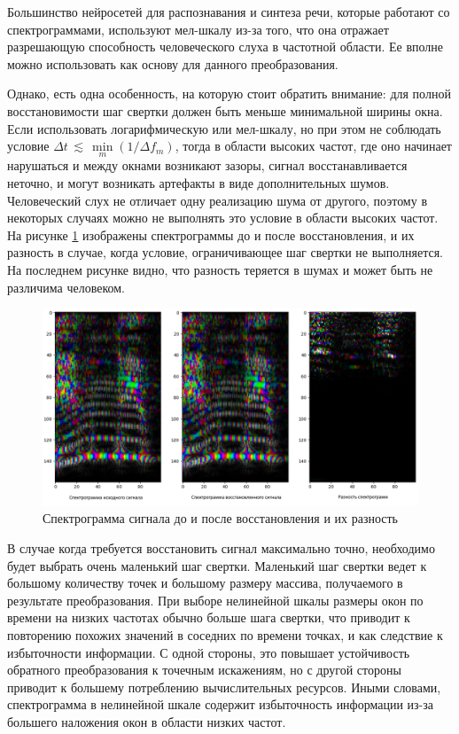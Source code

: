 Большинство нейросетей для распознавания и синтеза речи, которые работают со спектрограммами, используют мел-шкалу из-за того, что она отражает
разрешающую способность человеческого слуха в частотной области. Ее вполне можно использовать как основу для данного преобразования.

Однако, есть одна особенность, на которую стоит обратить внимание: 
для полной восстановимости шаг свертки должен быть меньше минимальной ширины окна. 
Если использовать логарифмическую или мел-шкалу, но при этом не соблюдать условие $ \Delta t \, \lesssim \, \min \limits_m (1/\Delta f_m) $,
тогда в области высоких частот, где оно начинает нарушаться и между окнами возникают зазоры, сигнал восстанавливается неточно, 
и могут возникать артефакты в виде дополнительных шумов. Человеческий слух не отличает одну реализацию шума от другого, 
поэтому в некоторых случаях можно не выполнять это условие в области высоких частот.
На рисунке \ref{fig:spec_diff} изображены спектрограммы до и после восстановления, и их разность в случае, 
когда условие, ограничивающее шаг свертки не выполняется. На последнем рисунке видно, 
что разность теряется в шумах и может быть не различима человеком.

\begin{figure}[t]
  \centering
  \includegraphics[width=0.8\linewidth]{figures/spec_diff}
  \caption{Спектрограмма сигнала до и после восстановления и их разность}
  \label{fig:spec_diff}
\end{figure}

В случае когда требуется восстановить сигнал максимально точно, необходимо будет выбрать очень маленький шаг свертки.
Маленький шаг свертки ведет к большому количеству точек и большому размеру массива, получаемого в результате преобразования. 
При выборе нелинейной шкалы размеры окон по времени на низких частотах обычно больше шага свертки, что приводит к 
повторению похожих значений в соседних по времени точках, и как следствие к избыточности информации. 
С одной стороны, это повышает устойчивость обратного преобразования к точечным искажениям, 
но с другой стороны приводит к большему потреблению вычислительных ресурсов. 
Иными словами, спектрограмма в нелинейной шкале содержит избыточность информации из-за большего наложения окон в области низких частот.

